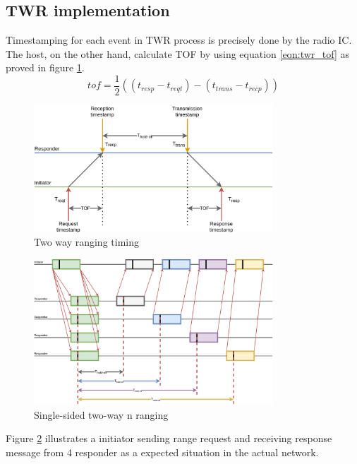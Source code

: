 \documentclass[\main/main.tex]{subfiles}
\begin{document}
\subsection{TWR implementation}
Timestamping for each event in TWR process is precisely done by the radio IC. The host, on the other hand, calculate TOF by using equation \ref{eqn:twr_tof} as proved in figure \ref{fig:twr_timing}.
\begin{equation}
    tof = \frac{1}{2} ((t_{resp} - t_{reqt}) - (t_{trans} - t_{recp}))
    \label{eqn:twr_tof}
\end{equation}
\begin{figure}[H]
    \begin{center}
        \includegraphics[width=0.8\textwidth]{twr_timing.png}
    \end{center}
    \caption{Two way ranging timing}
    \label{fig:twr_timing}
\end{figure}

\begin{figure}[H]
    \begin{center}
        \includegraphics[width=0.8\textwidth]{single_sided_two_way_nranging.png}
    \end{center}
    \caption{Single-sided two-way n ranging}
    \label{fig:single_sided_two_way_nranging}
\end{figure}
Figure \ref{fig:single_sided_two_way_nranging} illustrates a initiator sending range request and receiving response message from 4 responder as a expected situation in the actual network.
\end{document}
